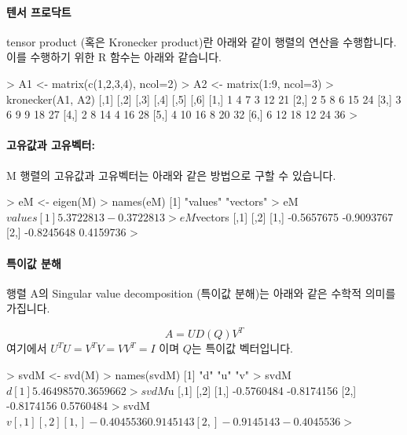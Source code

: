 \documentclass{book}
\begin{document}
\paragraph{텐서 프로닥트}  tensor product (혹은 Kronecker product)란 아래와 같이 행렬의 연산을 수행합니다. 
이를 수행하기 위한 R 함수는 아래와 같습니다. 

\begin{Schunk}
\begin{Soutput}
> A1 <- matrix(c(1,2,3,4), ncol=2)
> A2 <- matrix(1:9, ncol=3)
> kronecker(A1, A2)
     [,1] [,2] [,3] [,4] [,5] [,6]
[1,]    1    4    7    3   12   21
[2,]    2    5    8    6   15   24
[3,]    3    6    9    9   18   27
[4,]    2    8   14    4   16   28
[5,]    4   10   16    8   20   32
[6,]    6   12   18   12   24   36
> 	
\end{Soutput}
\end{Schunk}

\paragraph{고유값과 고유벡터:}  M 행렬의 고유값과 고유벡터는 아래와 같은 방법으로 구할 수 있습니다. 

\begin{Schunk}
\begin{Soutput}
> eM <- eigen(M)
> names(eM)
[1] "values"  "vectors"
> eM$values
[1]  5.3722813 -0.3722813
> eM$vectors
           [,1]       [,2]
[1,] -0.5657675 -0.9093767
[2,] -0.8245648  0.4159736
> 
\end{Soutput}
\end{Schunk}

\paragraph{특이값 분해}

행렬 A의 Singular value decomposition (특이값 분해)는 아래와 같은 수학적 의미를 가집니다. 

\begin{equation}
A = U D(Q) V^T
\end{equation}
%
여기에서 $ U^T U = V^T V = VV^T = I $ 이며 $Q$는 특이값 벡터입니다. 

\begin{Schunk}
\begin{Soutput}
> svdM <- svd(M)
> names(svdM)
[1] "d" "u" "v"
> svdM$d
[1] 5.4649857 0.3659662
> svdM$u
           [,1]       [,2]
[1,] -0.5760484 -0.8174156
[2,] -0.8174156  0.5760484
> svdM$v
           [,1]       [,2]
[1,] -0.4045536  0.9145143
[2,] -0.9145143 -0.4045536
> $
\end{Soutput}
\end{Schunk}
\end{document}
